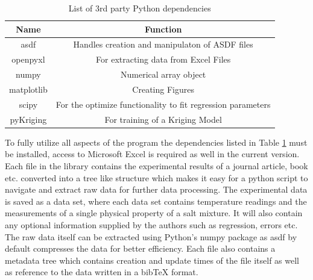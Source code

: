 \begin{table}[htp]
    \centering
    \caption{List of 3rd party Python dependencies}
    \begin{tabular}{c | c}
    \hline
    Name     &  Function  \\ \hline
    asdf     &  Handles creation and manipulaton of ASDF files \\
    openpyxl &  For extracting data from Excel Files \\
    numpy &  Numerical array object \\
    matplotlib & Creating Figures \\
    scipy & For the optimize functionality to fit regression parameters \\
    pyKriging & For training of a Kriging Model \\
    \hline
    \end{tabular}
    \label{tab:dependencies}
\end{table}
To fully utilize all aspects of the program the dependencies listed in Table \ref{tab:dependencies} must be installed, access to Microsoft Excel is required as well in the current version. \\
Each file in the library contains the experimental results of a journal article, book etc. converted into a tree like structure which makes it easy for a python script to navigate and extract raw data for further data processing. The experimental data is saved as a data set, where each data set contains temperature readings and the measurements of a single physical property of a salt mixture. It will also contain any optional information supplied by the authors such as regression, errors etc. The raw data itself can be extracted using Python's numpy package as asdf by default compresses the data for better efficiency. Each file also contains a metadata tree which contains creation and update times of the file itself as well as reference to the data written in a bibTeX format.

